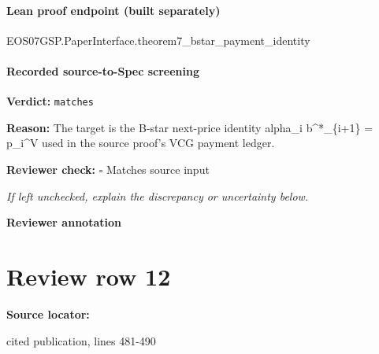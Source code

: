 \documentclass[10pt]{article}
\newcommand{\reviewerbox}{%
  \par\noindent\fbox{\parbox{0.96\linewidth}{\rule{0pt}{0.38in}}}\par
}
\newcommand{\reviewmatch}[1]{%
  \par\noindent\textbf{Reviewer check:} $\square$\; #1\par
  \noindent\emph{If left unchecked, explain the discrepancy or uncertainty below.}\par
}
\begin{document}
\paragraph{Lean proof endpoint (built separately)}\begin{ReviewVerbatim}
EOS07GSP.PaperInterface.theorem7_bstar_payment_identity
\end{ReviewVerbatim}

\paragraph{Recorded source-to-Spec screening}
\textbf{Verdict:} \texttt{matches}
\\
{\raggedright
\textbf{Reason:} The target is the B-\allowbreak{}star next-\allowbreak{}price identity alpha\_\allowbreak{}i b\textasciicircum{}*\_\allowbreak{}\{i+1\} = p\_\allowbreak{}i\textasciicircum{}V used in the source proof's VCG payment ledger.\allowbreak{}
\par}
\reviewmatch{Matches source input}
\noindent\textbf{Reviewer annotation}\par
\reviewerbox
\clearpage
\hypertarget{source-claim-4fc8a2389d1aac9f}{}
\section*{Review row 12}
\textbf{Source locator:} {\footnotesize\raggedright cited publication, lines 481-\allowbreak{}490\par}
\end{document}
